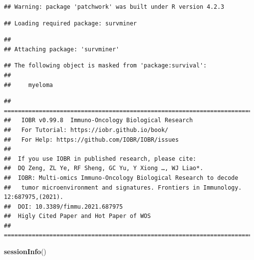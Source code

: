 \documentclass[
  12pt,
]{book}
\newenvironment{Shaded}{\begin{snugshade}}{\end{snugshade}}
\newcommand{\FunctionTok}[1]{\textcolor[rgb]{0.13,0.29,0.53}{\textbf{#1}}}
\newcommand{\NormalTok}[1]{#1}
\begin{document}
\begin{verbatim}
## Warning: package 'patchwork' was built under R version 4.2.3
\end{verbatim}

\begin{verbatim}
## Loading required package: survminer
\end{verbatim}

\begin{verbatim}
## 
## Attaching package: 'survminer'
\end{verbatim}

\begin{verbatim}
## The following object is masked from 'package:survival':
## 
##     myeloma
\end{verbatim}

\begin{verbatim}
## ==========================================================================
##   IOBR v0.99.8  Immuno-Oncology Biological Research 
##   For Tutorial: https://iobr.github.io/book/
##   For Help: https://github.com/IOBR/IOBR/issues
## 
##  If you use IOBR in published research, please cite:
##  DQ Zeng, ZL Ye, RF Sheng, GC Yu, Y Xiong …, WJ Liao*.
##  IOBR: Multi-omics Immuno-Oncology Biological Research to decode 
##   tumor microenvironment and signatures. Frontiers in Immunology. 12:687975,(2021). 
##  DOI: 10.3389/fimmu.2021.687975
##  Higly Cited Paper and Hot Paper of WOS
## ==========================================================================
\end{verbatim}

\begin{Shaded}
\begin{Highlighting}[]
\FunctionTok{sessionInfo}\NormalTok{()}
\end{Highlighting}
\end{Shaded}
\end{document}
